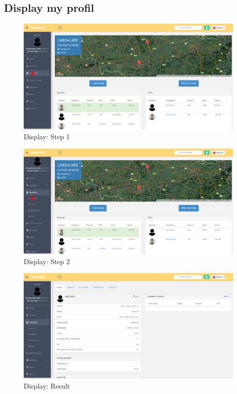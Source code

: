 \documentclass{article}
\begin{document}
\subsection{Display my profil}
\begin{figure}[!ht]
   \includegraphics[width=\textwidth]{img/profil1.png}
   \caption{Display: Step 1}
\end{figure}
\begin{figure}[!ht]
   \includegraphics[width=\textwidth]{img/profil2.png}
   \caption{Display: Step 2}
\end{figure}
\begin{figure}[!ht]
   \includegraphics[width=\textwidth]{img/profil3.png}
   \caption{Display: Result}
\end{figure}
\end{document}
